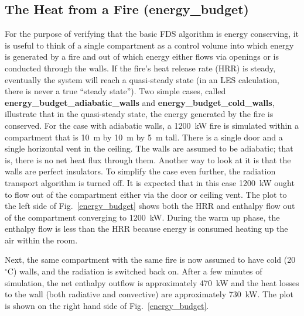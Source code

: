 \documentclass[11pt]{book}
\begin{document}
\subsection{The Heat from a Fire (\texorpdfstring{{\bf energy\_budget}}{energy\_budget})}

For the purpose of verifying that the basic FDS algorithm is energy conserving, it is useful to think of a single compartment as
a control volume into which energy is generated by a fire and out of which energy either flows via openings or is conducted
through the walls. If the fire's heat release rate (HRR) is steady, eventually the system will reach a quasi-steady state (in an LES
calculation, there is never a true ``steady state''). Two simple cases, called {\bf energy\_budget\_adiabatic\_walls} and
{\bf energy\_budget\_cold\_walls}, illustrate that in the quasi-steady state, the energy generated by the fire is conserved. For the
case with adiabatic walls, a 1200~kW fire is simulated within a compartment that is 10~m by 10~m by 5~m tall. There is a single
door and a single horizontal vent in the ceiling. The walls are assumed to be adiabatic; that is, there is no net heat flux through
them. Another way to look at it is that the walls are perfect insulators. To simplify the case even further, the radiation
transport algorithm is turned off. It is expected that in this case 1200~kW ought to flow out of the compartment either via the
door or ceiling vent. The plot to the left side of Fig.~\ref{energy_budget} shows both the HRR and enthalpy flow out of the compartment
converging to 1200~kW. During the warm up phase, the enthalpy flow is less than the HRR because energy is consumed heating
up the air within the room.

Next, the same compartment with the same fire is now assumed to have cold (20~$^\circ$C) walls, and the radiation is switched
back on. After a few minutes of simulation, the net enthalpy outflow is approximately 470~kW and the heat losses to the
wall (both radiative and convective) are approximately 730~kW. The plot is shown on the right hand side of Fig.~\ref{energy_budget}.
\end{document}
